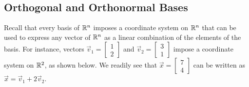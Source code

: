 \documentclass{ximera}
\begin{document}
\subsection*{Orthogonal and Orthonormal Bases}
Recall that every basis of $\mathbb{R}^n$ imposes a coordinate system on $\mathbb{R}^n$ that can be used to express any vector of $\mathbb{R}^n$ as a linear combination of the elements of the basis.  For instance,  vectors $\vec{v}_1=\begin{bmatrix}1\\2\end{bmatrix}$ and $\vec{v}_2=\begin{bmatrix}3\\1\end{bmatrix}$ impose a coordinate system on $\mathbb{R}^2$, as shown below.  We readily see that $\vec{x}=\begin{bmatrix}7\\4\end{bmatrix}$ can be written as $\vec{x}=\vec{v}_1+2\vec{v}_2$.
\end{document}
